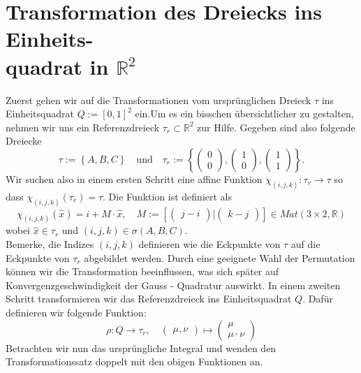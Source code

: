 \documentclass[12pt]{article}
\newcommand{\R}{\mathbb{R}}
\begin{document}
\section[Transformation des Dreiecks ins Einheitsquadrat in $\R^2$]{Transformation des Dreiecks ins Einheits-\\quadrat in $\R^2$}
Zuerst gehen wir auf die Transformationen vom ursprünglichen Dreieck $\tau$ ins Einheitsquadrat $Q:=[0,1]^2$ ein.Um es ein bisschen übersichtlicher zu gestalten, nehmen wir uns ein Referenzdreieck $\tau_r\subset\R^2$ zur Hilfe. Gegeben sind also folgende Dreiecke
\[
\tau := \left \{ A,B,C \right \}
\quad\text{und}\quad
\tau_r := \left \{ \begin{pmatrix} 0\\0 \end{pmatrix},
\begin{pmatrix} 1\\0\end{pmatrix},
\begin{pmatrix} 1\\1\end{pmatrix} \right \}.
\]
Wir suchen also in einem ersten Schritt eine affine Funktion $\chi_{(i,j,k)}:\tau_r\rightarrow\tau$ so dass $\chi_{(i,j,k)}(\tau_r)=\tau$. Die Funktion ist definiert als
\[
\chi_{(i,j,k)}(\hat{x})= i + M\cdot \hat{x}, \quad M := \left[ \begin{pmatrix} j-i \end{pmatrix} |
\begin{pmatrix} k-j \end{pmatrix} \right] \in Mat(3\times 2,\R)
\]
wobei $\hat{x}\in \tau_r$ und $(i,j,k)\in\sigma(A,B,C)$.\\
Bemerke, die Indizes $(i,j,k)$ definieren wie die Eckpunkte von $\tau$ auf die Eckpunkte von $\tau_r$ abgebildet werden. Durch eine geeignete Wahl der Permutation können wir die Transformation beeinflussen, was sich später auf Konvergenzgeschwindigkeit der Gauss - Quadratur auswirkt.
In einem zweiten Schritt transformieren wir das Referenzdreieck ins Einheitsquadrat $Q$. Dafür definieren wir folgende Funktion:
\[
\rho : Q \rightarrow \tau_r,\quad \begin{pmatrix} \mu,\nu \end{pmatrix} \mapsto
\begin{pmatrix} \mu\\\mu\cdot\nu \end{pmatrix}
\]
Betrachten wir nun das ursprüngliche Integral und wenden den Transformationssatz doppelt mit den obigen Funktionen an.
\end{document}

